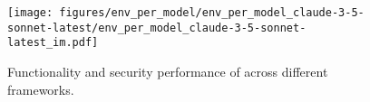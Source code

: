 
\begin{figure}[h]
    \centering
    \texttt{[image: figures/env\_per\_model/env\_per\_model\_claude-3-5-sonnet-latest/env\_per\_model\_claude-3-5-sonnet-latest\_im.pdf]}
    \caption{Functionality and security performance of \claudesonnet{} across different frameworks.}
    \label{fig:env_per_model_claude-3-5-sonnet-latest}
\end{figure}
